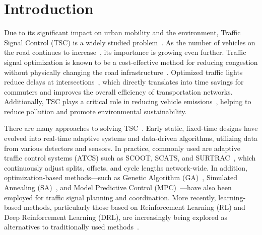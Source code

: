 \chapter*{Introduction}

%
%
%
%

Due to its significant impact on urban mobility and the environment, Traffic Signal Control (TSC) is a widely studied problem~\cite{zhao2012computational}. As the number of vehicles on the road continues to increase~\cite{caves2004encyclopedia}, its importance is growing even further.
Traffic signal optimization is known to be a cost-effective method for reducing congestion without physically changing the road infrastructure~\cite{wang2021traffic}.
Optimized traffic lights reduce delays at intersections~\cite{mu2022traffic}, which directly translates into time savings for commuters and improves the overall efficiency of transportation networks.
Additionally, TSC plays a critical role in reducing vehicle emissions~\cite{gunarathne2023traffic}, helping to reduce pollution and promote environmental sustainability.

There are many approaches to solving TSC~\cite{qadri2020state}. Early static, fixed-time designs have evolved into real-time adaptive systems and data-driven algorithms, utilizing data from various detectors and sensors. In practice, commonly used are adaptive traffic control systems (ATCS) such as SCOOT, SCATS, and SURTRAC~\cite{smith2013surtrac}, which continuously adjust splits, offsets, and cycle lengths network-wide. In addition, optimization-based methods---such as Genetic Algorithm (GA)~\cite{costa2020intersection}, Simulated Annealing (SA)~\cite{qadri2020state}, and Model Predictive Control (MPC)~\cite{ye2019survey}---have also been employed for traffic signal planning and coordination. More recently, learning-based methods, particularly those based on Reinforcement Learning (RL) and Deep Reinforcement Learning (DRL), are increasingly being explored as alternatives to traditionally used methods~\cite{zhao2024survey, saadi2025survey}.

